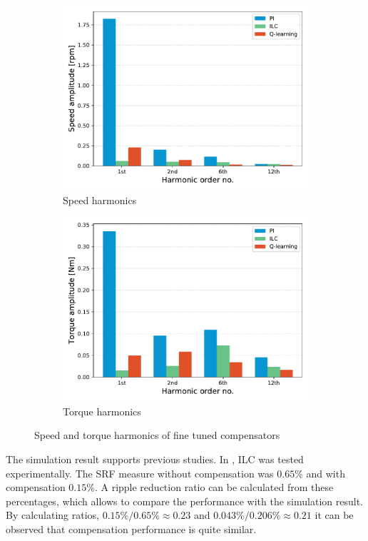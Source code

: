 \begin{figure}[htb]
\centering
\begin{subfigure}{0.5\textwidth}
  \centering
  \includegraphics[width=\textwidth]{images/simulations_ms4887_tuned_speed_pi_ilc_qlr.pdf}
  \caption{Speed harmonics}
\end{subfigure}%
\begin{subfigure}{.5\textwidth}
  \centering
  \includegraphics[width=\textwidth]{images/simulations_ms4887_tuned_torque_pi_ilc_qlr.pdf}
  \caption{Torque harmonics}
\end{subfigure}
\caption{Speed and torque harmonics of fine tuned compensators}
\label{sim:well-tuned}
\end{figure}
The simulation result supports previous studies. In \cite{ILC:2005}, ILC was tested experimentally. The SRF measure without compensation was $0.65\%$ and with compensation $0.15\%$. A ripple reduction ratio can be calculated from these percentages, which allows to compare the performance with the simulation result. By calculating ratios, $0.15\% / 0.65\% \approx 0.23$ and $0.043\% / 0.206\% \approx 0.21$ it can be observed that compensation performance is quite similar.

